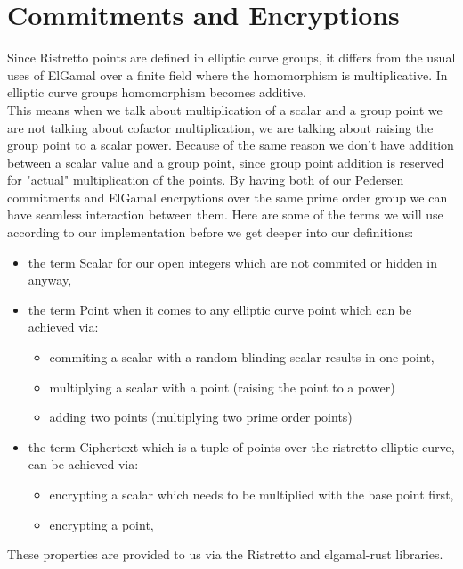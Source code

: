 \documentclass[12pt,a4paper]{report}
\begin{document}
\section{Commitments and Encryptions}
Since Ristretto points are defined in elliptic curve groups, it differs from the usual uses of ElGamal over a finite field where the homomorphism is multiplicative. 
In elliptic curve groups homomorphism becomes additive\cite{decaf}. 
\\This means when we talk about multiplication of a scalar and a group point we are not talking about cofactor multiplication, 
we are talking about raising the group point to a scalar power. Because of the same reason we don't have addition between 
a scalar value and a group point, since group point addition is reserved for "actual" multiplication of the points.
By having both of our Pedersen commitments and ElGamal encrpytions over the same prime order group we can have seamless interaction between them. 
Here are some of the terms we will use according to our implementation before we get deeper into our definitions:
\begin{itemize}
	\item the term Scalar for our open integers which are not commited or hidden in anyway, 
	\item the term Point when it comes to any elliptic curve point which can be achieved via: 
		\begin{itemize}
			\item commiting a scalar with a random blinding scalar results in one point,
			\item multiplying a scalar with a point (raising the point to a power)
			\item adding two points (multiplying two prime order points)
		\end{itemize}
	\item the term Ciphertext which is a tuple of points over the ristretto elliptic curve, can be achieved via:
		\begin{itemize}
			\item encrypting a scalar which needs to be multiplied with the base point first,
			\item encrypting a point,
		\end{itemize}
\end{itemize}

These properties are provided to us via the Ristretto and elgamal-rust\cite{egrust} libraries.
\end{document}
